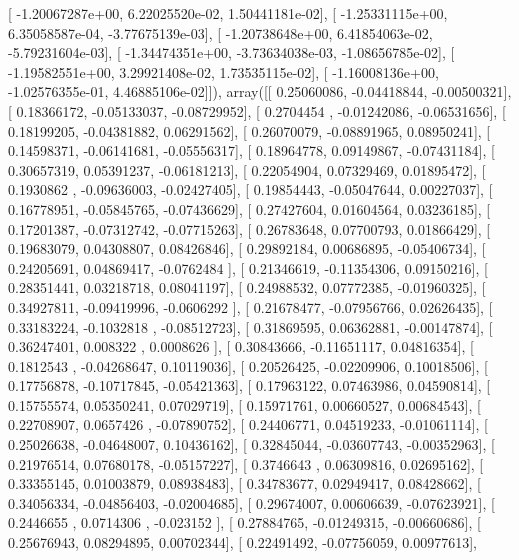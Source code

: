 \documentclass{article}
\begin{document}
       [ -1.20067287e+00,   6.22025520e-02,   1.50441181e-02],
       [ -1.25331115e+00,   6.35058587e-04,  -3.77675139e-03],
       [ -1.20738648e+00,   6.41854063e-02,  -5.79231604e-03],
       [ -1.34474351e+00,  -3.73634038e-03,  -1.08656785e-02],
       [ -1.19582551e+00,   3.29921408e-02,   1.73535115e-02],
       [ -1.16008136e+00,  -1.02576355e-01,   4.46885106e-02]]), array([[ 0.25060086, -0.04418844, -0.00500321],
       [ 0.18366172, -0.05133037, -0.08729952],
       [ 0.2704454 , -0.01242086, -0.06531656],
       [ 0.18199205, -0.04381882,  0.06291562],
       [ 0.26070079, -0.08891965,  0.08950241],
       [ 0.14598371, -0.06141681, -0.05556317],
       [ 0.18964778,  0.09149867, -0.07431184],
       [ 0.30657319,  0.05391237, -0.06181213],
       [ 0.22054904,  0.07329469,  0.01895472],
       [ 0.1930862 , -0.09636003, -0.02427405],
       [ 0.19854443, -0.05047644,  0.00227037],
       [ 0.16778951, -0.05845765, -0.07436629],
       [ 0.27427604,  0.01604564,  0.03236185],
       [ 0.17201387, -0.07312742, -0.07715263],
       [ 0.26783648,  0.07700793,  0.01866429],
       [ 0.19683079,  0.04308807,  0.08426846],
       [ 0.29892184,  0.00686895, -0.05406734],
       [ 0.24205691,  0.04869417, -0.0762484 ],
       [ 0.21346619, -0.11354306,  0.09150216],
       [ 0.28351441,  0.03218718,  0.08041197],
       [ 0.24988532,  0.07772385, -0.01960325],
       [ 0.34927811, -0.09419996, -0.0606292 ],
       [ 0.21678477, -0.07956766,  0.02626435],
       [ 0.33183224, -0.1032818 , -0.08512723],
       [ 0.31869595,  0.06362881, -0.00147874],
       [ 0.36247401,  0.008322  ,  0.0008626 ],
       [ 0.30843666, -0.11651117,  0.04816354],
       [ 0.1812543 , -0.04268647,  0.10119036],
       [ 0.20526425, -0.02209906,  0.10018506],
       [ 0.17756878, -0.10717845, -0.05421363],
       [ 0.17963122,  0.07463986,  0.04590814],
       [ 0.15755574,  0.05350241,  0.07029719],
       [ 0.15971761,  0.00660527,  0.00684543],
       [ 0.22708907,  0.0657426 , -0.07890752],
       [ 0.24406771,  0.04519233, -0.01061114],
       [ 0.25026638, -0.04648007,  0.10436162],
       [ 0.32845044, -0.03607743, -0.00352963],
       [ 0.21976514,  0.07680178, -0.05157227],
       [ 0.3746643 ,  0.06309816,  0.02695162],
       [ 0.33355145,  0.01003879,  0.08938483],
       [ 0.34783677,  0.02949417,  0.08428662],
       [ 0.34056334, -0.04856403, -0.02004685],
       [ 0.29674007,  0.00606639, -0.07623921],
       [ 0.2446655 ,  0.0714306 , -0.023152  ],
       [ 0.27884765, -0.01249315, -0.00660686],
       [ 0.25676943,  0.08294895,  0.00702344],
       [ 0.22491492, -0.07756059,  0.00977613],
\end{document}
